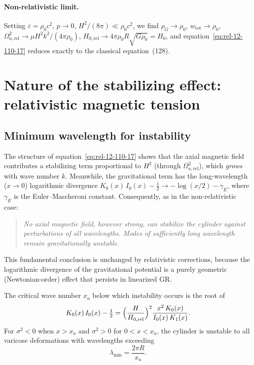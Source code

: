 \paragraph{Non-relativistic limit.}
Setting $\varepsilon = \rho_{0}c^{2}$, $p\to 0$,
$H^{2}/(8\pi) \ll \rho_{0}c^{2}$, we find
$\rho_{G} \to \rho_{0}$, $w_{\mathrm{tot}} \to \rho_{0}$,
$\Omega_{a,\mathrm{rel}}^{2} \to \mu H^{2}k^{2}/(4\pi\rho_{0})$,
$H_{0,\mathrm{rel}} \to 4\pi\rho_{0}R\sqrt{G\rho_{0}} = H_{0}$, and
equation~\eqref{eq:rel-12-110-17} reduces exactly to the classical
equation~(128).

\section{Nature of the stabilizing effect: relativistic magnetic tension}
\label{sec:rel-12-110-nature}

\subsection{Minimum wavelength for instability}
\label{sec:rel-12-110-minstab}

The structure of equation~\eqref{eq:rel-12-110-17} shows that the
axial magnetic field contributes a stabilizing term proportional to
$H^{2}$ (through $\Omega_{a,\mathrm{rel}}^{2}$), which \emph{grows}
with wave number $k$.  Meanwhile, the gravitational term has the
long-wavelength ($x\to 0$) logarithmic divergence
$K_{0}(x)\,I_{0}(x) - \frac{1}{2} \to -\log(x/2) - \gamma_{E}$,
where $\gamma_{E}$ is the Euler--Mascheroni constant.  Consequently,
as in the non-relativistic case:

\begin{quote}
\emph{No axial magnetic field, however strong, can stabilize the
cylinder against perturbations of all wavelengths.  Modes of
sufficiently long wavelength remain gravitationally unstable.}
\end{quote}

This fundamental conclusion is unchanged by relativistic corrections,
because the logarithmic divergence of the gravitational potential is a
purely geometric (Newtonian-order) effect that persists in linearized
GR.

The critical wave number $x_{a}$ below which instability occurs is the
root of
\begin{equation}
\label{eq:rel-12-110-18}
K_{0}(x)\,I_{0}(x) - \tfrac{1}{2}
= \Bigl(\frac{H}{H_{0,\mathrm{rel}}}\Bigr)^{2}
\frac{x^{2}\,K_{0}(x)}{I_{0}(x)\,K_{1}(x)}.
\end{equation}
For $\sigma^{2} < 0$ when $x > x_{a}$ and $\sigma^{2} > 0$ for
$0 < x < x_{a}$, the cylinder is unstable to all varicose
deformations with wavelengths exceeding
\begin{equation}
\label{eq:rel-12-110-19}
\lambda_{\min} = \frac{2\pi R}{x_{a}}.
\end{equation}

